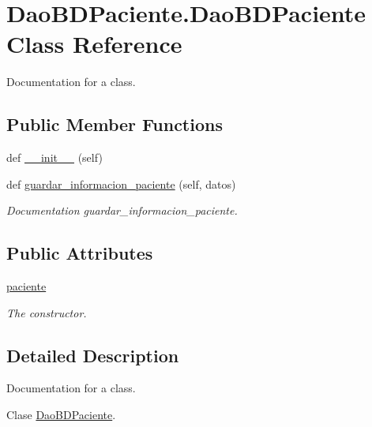 \hypertarget{class_dao_b_d_paciente_1_1_dao_b_d_paciente}{}\section{Dao\+B\+D\+Paciente.\+Dao\+B\+D\+Paciente Class Reference}
\label{class_dao_b_d_paciente_1_1_dao_b_d_paciente}


Documentation for a class.  


\subsection*{Public Member Functions}
\begin{DoxyCompactItemize}
\item 
def \mbox{\hyperlink{class_dao_b_d_paciente_1_1_dao_b_d_paciente_a86886774d1498857ed82b3f872b245ba}{\+\_\+\+\_\+init\+\_\+\+\_\+}} (self)
\item 
def \mbox{\hyperlink{class_dao_b_d_paciente_1_1_dao_b_d_paciente_aae9bd6b75ec17367181453538188b632}{guardar\+\_\+informacion\+\_\+paciente}} (self, datos)
\begin{DoxyCompactList}\small\item\em Documentation guardar\+\_\+informacion\+\_\+paciente. \end{DoxyCompactList}\end{DoxyCompactItemize}
\subsection*{Public Attributes}
\begin{DoxyCompactItemize}
\item 
\mbox{\hyperlink{class_dao_b_d_paciente_1_1_dao_b_d_paciente_a427d394aacffefeb2e31027408a0fe41}{paciente}}
\begin{DoxyCompactList}\small\item\em The constructor. \end{DoxyCompactList}\end{DoxyCompactItemize}


\subsection{Detailed Description}
Documentation for a class. 

Clase \mbox{\hyperlink{class_dao_b_d_paciente_1_1_dao_b_d_paciente}{Dao\+B\+D\+Paciente}}. 

